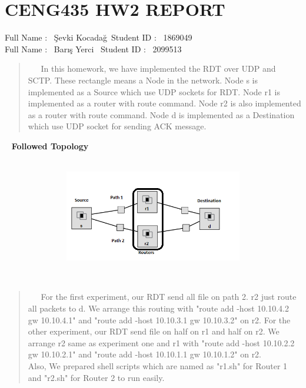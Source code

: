 \documentclass[12pt]{article}
\begin{document}
\section*{CENG435 HW2 REPORT} 

Full Name :  \ Şevki Kocadağ\
Student ID :  \ 1869049 \
\\
Full Name :  \ Barış Yerci \
Student ID :  \ 2099513 \


\begin{quote}
$\ \  \ \ \ \ \ $In this homework, we have implemented the RDT over UDP and SCTP.
These rectangle means a Node in the network.
Node s is implemented as a Source which use UDP sockets for RDT.
Node r1 is implemented as a router with route command.
Node r2 is also implemented as a router with route command.
Node d is implemented as a Destination which use UDP socket for sending ACK message.
\end{quote}


\
\centering
\large
\textbf{Followed Topology}

\
\
\includegraphics[width = 170mm, height = 40mm]{topology}

\
\


\normalsize
\begin{quote}
$\ \  \ \ \ \ \ $For the first experiment, our RDT send all file on path 2. r2 just route all packets to d. We arrange this routing with "route add -host 10.10.4.2 gw 10.10.4.1" and "route add -host 10.10.3.1 gw 10.10.3.2" on r2. For the other experiment, our RDT send file on half on r1 and half on r2. We arrange r2 same as experiment one and r1 with "route add -host 10.10.2.2 gw 10.10.2.1" and "route add -host 10.10.1.1 gw 10.10.1.2" on r2.
\\
Also, We prepared shell scripts which are named as "r1.sh" for Router 1 and "r2.sh" for Router 2 to run easily.
\end{quote}
\end{document}
